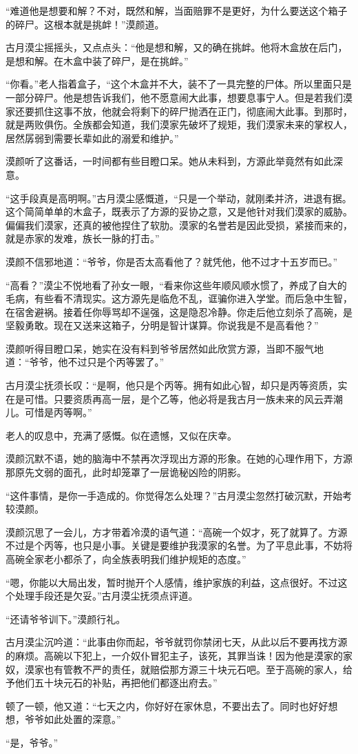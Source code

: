 \begin{this_body}
“难道他是想要和解？不对，既然和解，当面赔罪不是更好，为什么要送这个箱子的碎尸。这根本就是挑衅！”漠颜道。

古月漠尘摇摇头，又点点头：“他是想和解，又的确在挑衅。他将木盒放在后门，是想和解。在木盒中装了碎尸，是在挑衅。”

“你看。”老人指着盒子，“这个木盒并不大，装不了一具完整的尸体。所以里面只是一部分碎尸。他是想告诉我们，他不愿意闹大此事，想要息事宁人。但是若我们漠家还要抓住这事不放，他就会将剩下的碎尸抛洒在正门，彻底闹大此事。到那时，就是两败俱伤。全族都会知道，我们漠家先破坏了规矩，我们漠家未来的掌权人，居然孱弱到需要长辈如此的溺爱和维护。”

漠颜听了这番话，一时间都有些目瞪口呆。她从未料到，方源此举竟然有如此深意。

“这手段真是高明啊。”古月漠尘感慨道，“只是一个举动，就刚柔并济，进退有据。这个简简单单的木盒子，既表示了方源的妥协之意，又是他针对我们漠家的威胁。偏偏我们漠家，还真的被他捏住了软肋。漠家的名誉若是因此受损，紧接而来的，就是赤家的发难，族长一脉的打击。”

漠颜不信邪地道：“爷爷，你是否太高看他了？就凭他，他不过才十五岁而已。”

“高看？”漠尘不悦地看了孙女一眼，“看来你这些年顺风顺水惯了，养成了自大的毛病，有些看不清现实。这方源先是临危不乱，诓骗你进入学堂。而后急中生智，在宿舍避祸。接着任你辱骂却不逞强，这是隐忍冷静。你走后他立刻杀了高碗，是坚毅勇敢。现在又送来这箱子，分明是智计谋算。你说我是不是高看他？”

漠颜听得目瞪口呆，她实在没有料到爷爷居然如此欣赏方源，当即不服气地道：“爷爷，他不过只是个丙等罢了。”

古月漠尘抚须长叹：“是啊，他只是个丙等。拥有如此心智，却只是丙等资质，实在是可惜。只要资质再高一层，是个乙等，他必将是我古月一族未来的风云弄潮儿。可惜是丙等啊。”

老人的叹息中，充满了感慨。似在遗憾，又似在庆幸。

漠颜沉默不语，她的脑海中不禁再次浮现出方源的形象。在她的心理作用下，方源那原先文弱的面孔，此时却笼罩了一层诡秘凶险的阴影。

“这件事情，是你一手造成的。你觉得怎么处理？”古月漠尘忽然打破沉默，开始考较漠颜。

漠颜沉思了一会儿，方才带着冷漠的语气道：“高碗一个奴才，死了就算了。方源不过是个丙等，也只是小事。关键是要维护我漠家的名誉。为了平息此事，不妨将高碗全家老小都杀了，向全族表明我们维护规矩的态度。”

“嗯，你能以大局出发，暂时抛开个人感情，维护家族的利益，这点很好。不过这个处理手段还是欠妥。”古月漠尘抚须点评道。

“还请爷爷训下。”漠颜行礼。

古月漠尘沉吟道：“此事由你而起，爷爷就罚你禁闭七天，从此以后不要再找方源的麻烦。高碗以下犯上，一介奴仆冒犯主子，该死，其罪当诛！因为他是漠家的家奴，漠家也有管教不严的责任，就赔偿那方源三十块元石吧。至于高碗的家人，给予他们五十块元石的补贴，再把他们都逐出府去。”

顿了一顿，他又道：“七天之内，你好好在家休息，不要出去了。同时也好好想想，爷爷如此处置的深意。”

“是，爷爷。”

\end{this_body}


